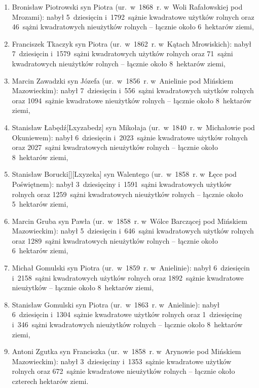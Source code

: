 \begin{enumerate}
    rolnych oraz 48~sążni kwadratowych nieużytków rolnych -- łącznie około
    6~hektarów ziemi,
    \item Bronisław Piotrowski syn Piotra (ur.~w~1868~r. w~Woli Rafałowskiej pod Mrozami):
    nabył 5~dziesięcin i~1792~sążnie kwadratowe użytków rolnych oraz 46~sążni
    kwadratowych nieużytków rolnych -- łącznie około 6~hektarów ziemi,
    \item Franciszek Tkaczyk
    syn Piotra (ur.~w~1862~r. w~Kątach Mrowiskich): nabył 7~dziesięcin
    i~1579~sążni kwadratowych użytków rolnych oraz 71~sążni kwadratowych
    nieużytków rolnych -- łącznie około 8~hektarów ziemi,
    \item Marcin Zawadzki syn
    Józefa (ur.~w~1856~r. w~Anielinie pod Mińskiem Mazowieckim): nabył
    7~dziesięcin i~556~sążni kwadratowych użytków rolnych oraz 1094~sążnie
    kwadratowe nieużytków rolnych -- łącznie około 8~hektarów ziemi,
    \item Stanisław Łabędź[Lxyzabedz]
    syn Mikołaja (ur.~w~1840~r. w~Michałowie pod Okuniewem): nabył
    6~dziesięcin i~2023~sążnie kwadratowe użytków rolnych oraz 2027~sążni
    kwadratowych nieużytków rolnych -- łącznie około 8~hektarów ziemi,
    \item Stanisław Borucki[][Lxyzeka]
    syn Walentego (ur.~w~1858~r. w~Łęce pod Poświętnem): nabył 3~dziesięciny
    i~1591~sążni kwadratowych użytków rolnych oraz 1259~sążni kwadratowych
    nieużytków rolnych -- łącznie około 5~hektarów ziemi,
    \item Marcin Gruba syn
    Pawła (ur.~w~1858~r. w~Wólce Barczącej pod Mińskiem Mazowieckim): nabył
    5~dziesięcin i~646~sążni kwadratowych użytków rolnych oraz 1289~sążni
    kwadratowych nieużytków rolnych -- łącznie około 6~hektarów ziemi,
    \item Michał Gomulski syn
    Piotra (ur.~w~1859~r. w~Anielinie): nabył 6~dziesięcin i~2158~sążni
    kwadratowych użytków rolnych oraz 1892~sążnie kwadratowe nieużytków
    -- łącznie około 8~hektarów ziemi,
    \item Stanisław Gomulski
    syn Piotra (ur.~w~1863~r. w~Anielinie): nabył 6~dziesięcin i~1304~sążnie
    kwadratowe użytków rolnych oraz 1~dziesięcinę i~346~sążni kwadratowych
    nieużytków rolnych -- łącznie około 8~hektarów ziemi,
    \item Antoni Zgutka syn
    Franciszka (ur.~w~1858~r. w~Arynowie pod Mińskiem Mazowieckim): nabył
    3~dziesięciny i~1353~sążnie kwadratowe użytków rolnych oraz 672~sążnie
    kwadratowe nieużytków rolnych -- łącznie około czterech hektarów ziemi.
\end{enumerate}

